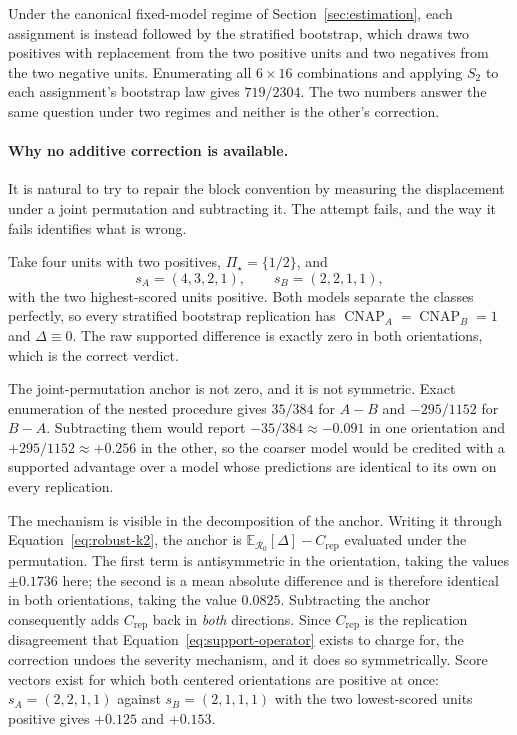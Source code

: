 \documentclass[11pt]{article}
\newcommand{\CNAP}{\operatorname{CNAP}}
\newcommand{\Regime}{\mathcal{R}}
\newcommand{\PSet}{\Pi_\star}
\newcommand{\E}{\mathbb{E}}
\theoremstyle{remark}
\begin{document}
Under the canonical fixed-model regime of Section~\ref{sec:estimation}, each assignment is instead followed by the stratified bootstrap, which draws two positives with replacement from the two positive units and two negatives from the two negative units. Enumerating all $6\times16$ combinations and applying $S_2$ to each assignment's bootstrap law gives $719/2304$. The two numbers answer the same question under two regimes and neither is the other's correction.

\paragraph{Why no additive correction is available.}
\label{app:no-correction}
It is natural to try to repair the block convention by measuring the displacement under a joint permutation and subtracting it. The attempt fails, and the way it fails identifies what is wrong.

Take four units with two positives, $\PSet=\{1/2\}$, and
\[
s_A=(4,3,2,1),
\qquad
s_B=(2,2,1,1),
\]
with the two highest-scored units positive. Both models separate the classes perfectly, so every stratified bootstrap replication has $\CNAP_A=\CNAP_B=1$ and $\Delta\equiv0$. The raw supported difference is exactly zero in both orientations, which is the correct verdict.

The joint-permutation anchor is not zero, and it is not symmetric. Exact enumeration of the nested procedure gives $35/384$ for $A-B$ and $-295/1152$ for $B-A$. Subtracting them would report $-35/384\approx-0.091$ in one orientation and $+295/1152\approx+0.256$ in the other, so the coarser model would be credited with a supported advantage over a model whose predictions are identical to its own on every replication.

The mechanism is visible in the decomposition of the anchor. Writing it through Equation~\eqref{eq:robust-k2}, the anchor is $\E_{\Regime_0}[\Delta]-C_{\mathrm{rep}}$ evaluated under the permutation. The first term is antisymmetric in the orientation, taking the values $\pm0.1736$ here; the second is a mean absolute difference and is therefore identical in both orientations, taking the value $0.0825$. Subtracting the anchor consequently adds $C_{\mathrm{rep}}$ back in \emph{both} directions. Since $C_{\mathrm{rep}}$ is the replication disagreement that Equation~\eqref{eq:support-operator} exists to charge for, the correction undoes the severity mechanism, and it does so symmetrically. Score vectors exist for which both centered orientations are positive at once: $s_A=(2,2,1,1)$ against $s_B=(2,1,1,1)$ with the two lowest-scored units positive gives $+0.125$ and $+0.153$.
\end{document}
